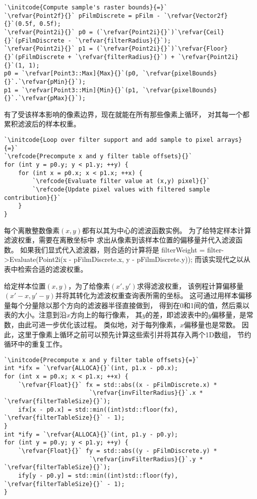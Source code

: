 \begin{lstlisting}
`\initcode{Compute sample's raster bounds}{=}`
`\refvar{Point2f}{}` pFilmDiscrete = pFilm - `\refvar{Vector2f}{}`(0.5f, 0.5f);
`\refvar{Point2i}{}` p0 = (`\refvar{Point2i}{}`)`\refvar{Ceil}{}`(pFilmDiscrete - `\refvar{filterRadius}{}`);
`\refvar{Point2i}{}` p1 = (`\refvar{Point2i}{}`)`\refvar{Floor}{}`(pFilmDiscrete + `\refvar{filterRadius}{}`) + `\refvar{Point2i}{}`(1, 1);
p0 = `\refvar[Point3::Max]{Max}{}`(p0, `\refvar{pixelBounds}{}`.`\refvar{pMin}{}`);
p1 = `\refvar[Point3::Min]{Min}{}`(p1, `\refvar{pixelBounds}{}`.`\refvar{pMax}{}`);
\end{lstlisting}

有了受该样本影响的像素边界，现在就能在所有那些像素上循环，
对其每一个都累积滤波后的样本权重。
\begin{lstlisting}
`\initcode{Loop over filter support and add sample to pixel arrays}{=}`
`\refcode{Precompute x and y filter table offsets}{}`
for (int y = p0.y; y < p1.y; ++y) {
    for (int x = p0.x; x < p1.x; ++x) {
        `\refcode{Evaluate filter value at (x,y) pixel}{}`
        `\refcode{Update pixel values with filtered sample contribution}{}`
    }
}
\end{lstlisting}

每个离散整数像素$(x,y)$都有以其为中心的滤波函数实例。
为了给特定样本计算滤波权重，需要在离散坐标中
求出从像素到该样本位置的偏移量并代入滤波函数。
如果我们显式代入滤波器，则合适的计算将是
{\ttfamily\newline\noindent
filterWeight = filter->Evaluate(Point2i(x - pFilmDiscrete.x,\newline\noindent
\indent\indent\indent\indent\indent\indent\indent\indent\indent\indent\quad y - pFilmDiscrete.y));\newline\noindent}
而该实现代之以从表中检索合适的滤波权重。

给定样本位置$(x,y)$，为了给像素$(x',y')$求得滤波权重，
该例程计算偏移量$(x'-x,y'-y)$并将其转化为滤波权重查询表所需的坐标。
这可通过用样本偏移量每个分量除以那个方向的滤波器半径直接做到，
得到在0和1间的值，然后乘以表的大小。注意到沿$x$方向上的每行像素，
其$y$的差，即滤波表中的$y$偏移量，是常数，由此可进一步优化该过程。
类似地，对于每列像素，$x$偏移量也是常数。
因此，这里于像素上循环之前可以预先计算这些索引并将其存入两个1D数组，
节约循环中的重复工作。
\begin{lstlisting}
`\initcode{Precompute x and y filter table offsets}{=}`
int *ifx = `\refvar{ALLOCA}{}`(int, p1.x - p0.x);
for (int x = p0.x; x < p1.x; ++x) {
    `\refvar{Float}{}` fx = std::abs((x - pFilmDiscrete.x) * 
                        `\refvar{invFilterRadius}{}`.x * `\refvar{filterTableSize}{}`);
    ifx[x - p0.x] = std::min((int)std::floor(fx), `\refvar{filterTableSize}{}` - 1);
}
int *ify = `\refvar{ALLOCA}{}`(int, p1.y - p0.y);
for (int y = p0.y; y < p1.y; ++y) {
    `\refvar{Float}{}` fy = std::abs((y - pFilmDiscrete.y) * 
                        `\refvar{invFilterRadius}{}`.y * `\refvar{filterTableSize}{}`);
    ify[y - p0.y] = std::min((int)std::floor(fy), `\refvar{filterTableSize}{}` - 1);
}
\end{lstlisting}


